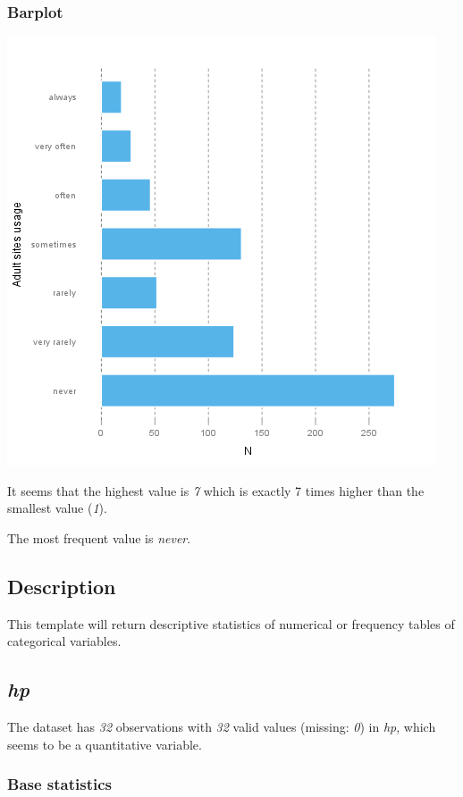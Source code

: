 \documentclass[]{article}
\makeatletter
\def\maxwidth{\ifdim\Gin@nat@width>\linewidth\linewidth
\else\Gin@nat@width\fi}
\let\Oldincludegraphics\includegraphics
\renewcommand{\includegraphics}[1]{\Oldincludegraphics[width=\maxwidth]{#1}}
\makeatother
\begin{document}
\subsubsection{Barplot}

\href{cbda2b116fe3f7095f2997068f945424-hires.png}{\includegraphics{cbda2b116fe3f7095f2997068f945424.png}}

It seems that the highest value is \emph{7} which is exactly 7 times
higher than the smallest value (\emph{1}).

The most frequent value is \emph{never}.

\subsection{Description}

This template will return descriptive statistics of numerical or
frequency tables of categorical variables.

\subsection{\emph{hp}}

The dataset has \emph{32} observations with \emph{32} valid values
(missing: \emph{0}) in \emph{hp}, which seems to be a quantitative
variable.

\subsubsection{Base statistics}
\end{document}
